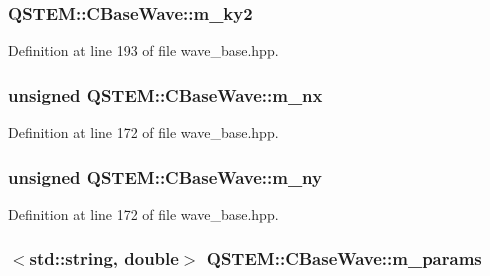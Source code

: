 \hypertarget{class_q_s_t_e_m_1_1_c_base_wave_abafe64d0c878af482eb5232ef22073b6}{
\subsubsection[{m\-\_\-ky2}]{ Q\-S\-T\-E\-M\-::\-C\-Base\-Wave\-::m\-\_\-ky2\hspace{0.3cm}{\ttfamily [protected]}}}\label{class_q_s_t_e_m_1_1_c_base_wave_abafe64d0c878af482eb5232ef22073b6}


Definition at line 193 of file wave\-\_\-base.\-hpp.

\hypertarget{class_q_s_t_e_m_1_1_c_base_wave_ab5898946b6edd6fc0db7ad34d75073f3}{
\subsubsection[{m\-\_\-nx}]{\setlength{\rightskip}{0pt plus 5cm}unsigned Q\-S\-T\-E\-M\-::\-C\-Base\-Wave\-::m\-\_\-nx\hspace{0.3cm}{\ttfamily [protected]}}}\label{class_q_s_t_e_m_1_1_c_base_wave_ab5898946b6edd6fc0db7ad34d75073f3}


Definition at line 172 of file wave\-\_\-base.\-hpp.

\hypertarget{class_q_s_t_e_m_1_1_c_base_wave_aabad4f5469c50c2731b007d9ca904a6a}{
\subsubsection[{m\-\_\-ny}]{\setlength{\rightskip}{0pt plus 5cm}unsigned Q\-S\-T\-E\-M\-::\-C\-Base\-Wave\-::m\-\_\-ny\hspace{0.3cm}{\ttfamily [protected]}}}\label{class_q_s_t_e_m_1_1_c_base_wave_aabad4f5469c50c2731b007d9ca904a6a}


Definition at line 172 of file wave\-\_\-base.\-hpp.

\hypertarget{class_q_s_t_e_m_1_1_c_base_wave_aed67a43a81a61c94d60d47125b628f0e}{
\subsubsection[{m\-\_\-params}]{$<$std\-::string, double$>$ Q\-S\-T\-E\-M\-::\-C\-Base\-Wave\-::m\-\_\-params\hspace{0.3cm}{\ttfamily [protected]}}}\label{class_q_s_t_e_m_1_1_c_base_wave_aed67a43a81a61c94d60d47125b628f0e}


